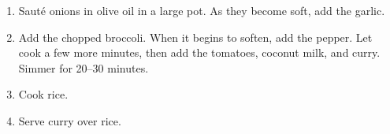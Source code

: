 
\begin{ingredients}
\end{ingredients}


\begin{recipe}
  \begin{enumerate}

  \item Saut\'e onions in olive oil in a large pot.  As they become
    soft, add the garlic.  

  \item Add the chopped broccoli.  When it begins to soften, add the
    pepper.  Let cook a few more minutes, then add the tomatoes,
    coconut milk, and curry.  Simmer for 20--30 minutes.

  \item Cook rice.

  \item Serve curry over rice.

  \end{enumerate}
\end{recipe}
